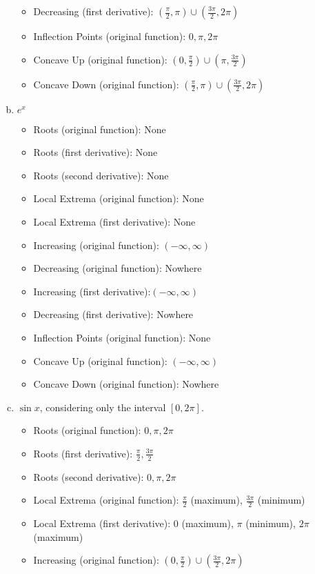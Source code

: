 \documentclass[11pt]{article}
\theoremstyle{definition}
\theoremstyle{remark}
\begin{document}
\begin{enumerate}[(a)]
{\begin{itemize}
    \item Decreasing (first derivative): $(\frac{\pi}{2}, \pi) \cup (\frac{3\pi}{2}, 2\pi)$
    \item Inflection Points (original function): $0, \pi, 2\pi$
    \item Concave Up (original function): $(0, \frac{\pi}{2}) \cup (\pi, \frac{3\pi}{2})$
    \item Concave Down (original function): $(\frac{\pi}{2}, \pi) \cup (\frac{3\pi}{2}, 2\pi)$
\end{itemize}}
\item $ \displaystyle e^x$
{\color{red} \begin{itemize}
    \item Roots (original function): None
    \item Roots (first derivative): None
    \item Roots (second derivative): None
    \item Local Extrema (original function): None
    \item Local Extrema (first derivative): None
    \item Increasing (original function): $(-\infty, \infty)$
    \item Decreasing (original function): Nowhere
    \item Increasing (first derivative):$(-\infty, \infty)$
    \item Decreasing (first derivative): Nowhere
    \item Inflection Points (original function): None
    \item Concave Up (original function): $(-\infty, \infty)$
    \item Concave Down (original function): Nowhere
\end{itemize}}
\item $ \displaystyle \sin x$, considering only the interval $[0,2\pi]$.
{\color{red} \begin{itemize}
    \item Roots (original function): $0, \pi, 2\pi$
    \item Roots (first derivative): $\frac{\pi}{2}, \frac{3\pi}{2}$
    \item Roots (second derivative): $0, \pi, 2\pi$
    \item Local Extrema (original function): $\frac{\pi}{2}$ (maximum), $\frac{3\pi}{2}$ (minimum)
    \item Local Extrema (first derivative): $0$ (maximum), $\pi$ (minimum), $2\pi$ (maximum)
    \item Increasing (original function): $(0, \frac{\pi}{2}) \cup (\frac{3\pi}{2}, 2\pi)$

\end{itemize}}
\end{enumerate}
\end{document}

